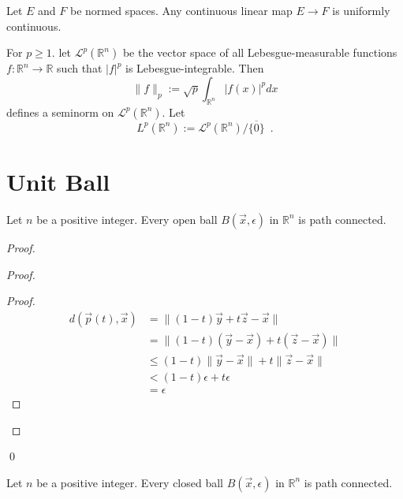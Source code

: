 \begin{prop}
Let $E$ and $F$ be normed spaces. Any continuous linear map $E \rightarrow F$ is uniformly continuous.
\end{prop}

\begin{df}
For $p \geq 1$. let $\mathcal{L}^p(\mathbb{R}^n)$ be the vector space of all Lebesgue-measurable functions $f : \mathbb{R}^n \rightarrow \mathbb{R}$ such that $|f|^p$ is Lebesgue-integrable. Then
\[ \| f \|_p := \sqrt{p}{\int_{\mathbb{R}^n} |f(x)|^p dx} \]
defines a seminorm on $\mathcal{L}^p(\mathbb{R}^n)$. Let
\[ L^p(\mathbb{R}^n) := \mathcal{L}^p(\mathbb{R}^n) / \overline{\{0\}} \enspace . \]
\end{df}

\section{Unit Ball}

\begin{prop}
Let $n$ be a positive integer.
Every open ball $B(\vec{x}, \epsilon)$ in $\mathbb{R}^n$ is path connected.
\end{prop}

\begin{proof}
\pf
{}
\begin{proof}
	\begin{proof}
		\pf
		\begin{align*}
			d(\vec{p}(t),\vec{x})
			& = \| (1-t) \vec{y} + t \vec{z} - \vec{x} \| \\
			& = \| (1-t) (\vec{y} - \vec{x}) + t (\vec{z} - \vec{x}) \| \\
			& \leq (1-t) \| \vec{y} - \vec{x} \| + t \| \vec{z} - \vec{x} \| \\
			& < (1 - t) \epsilon + t \epsilon \\
			& = \epsilon
		\end{align*}
	\end{proof}
\end{proof}
\qed
\end{proof}

\begin{prop}
Let $n$ be a positive integer.
Every closed ball $B(\vec{x}, \epsilon)$ in $\mathbb{R}^n$ is path connected.
\end{prop}

